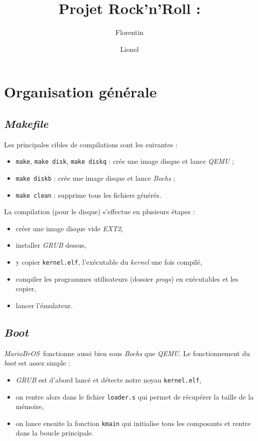 \documentclass[a4paper, 10pt, french]{article}
\title{Projet Rock'n'Roll : \mariobros}
\author{Florentin \bsc{Guth} \and Lionel \bsc{Zoubritzky}}
\newcommand{\source}[5]{
  \begin{table}[H]
    \centering
    \small
\inputminted[frame=lines,linenos,style=colorful,fontfamily=tt,breaklines,
autogobble,firstline=#3,firstnumber=#3,lastline=#4,label={#2[#3--#4]}]{#1
}{../#2}
    
\captionsetup{name=Listing,labelformat=listing,labelsep=endash,labelfont={sc}}
    \caption{#5}
  \end{table}
  }
\newcommand{\codeC}[1]{\texttt{#1}}
\newcommand{\code}[1]{\texttt{#1}}
\newcommand{\foreign}[1]{\emph{#1}}
\newcommand{\mariobros}{\foreign{MarioBrOS}}
\begin{document}
\maketitle


\tableofcontents

\clearpage

%
% 
% 
% 

\section{Organisation générale}

\subsection{\foreign{Makefile}}

Les principales cibles de compilations sont les suivantes :
\begin{itemize}
 \item \code{make}, \code{make disk}, \code{make diskq} : crée une image disque 
et lance \foreign{QEMU} ;
 \item \code{make diskb} : crée une image disque et lance \foreign{Bochs} ;
 \item \code{make clean} : supprime tous les fichiers générés.
\end{itemize}

La compilation (pour le disque) s'effectue en plusieurs étapes :
\begin{itemize}
 \item créer une image disque vide \foreign{EXT2},
 \item installer \foreign{GRUB} dessus,
 \item y copier \code{kernel.elf}, l'exécutable du \foreign{kernel} une fois 
compilé,
 \item compiler les programmes utilisateurs (dossier \foreign{progs}) en 
exécutables et les copier,
 \item lancer l'émulateur.
\end{itemize}



\subsection{\foreign{Boot}}

\mariobros\ fonctionne aussi bien sous \foreign{Bochs} que \foreign{QEMU}. Le 
fonctionnement du \foreign{boot} est assez simple :
\begin{itemize}
 \item \foreign{GRUB} est d'abord lancé et détecte notre noyau 
\code{kernel.elf},
 \item on rentre alors dans le fichier \code{loader.s} qui permet de récupérer 
la taille de la mémoire,
 \item on lance ensuite la fonction \code{kmain} qui initialise tous les 
composants et rentre dans la boucle principale.
\end{itemize}
\end{document}
